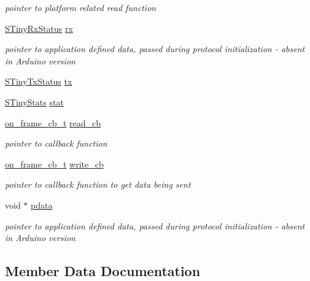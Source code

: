 \begin{DoxyCompactItemize}
\begin{DoxyCompactList}\small\item\em pointer to platform related read function \end{DoxyCompactList}\item 
\hyperlink{structSTinyRxStatus}{S\+Tiny\+Rx\+Status} \hyperlink{structSTinyData_aa3b43db99a1a6bf3d562f932d5a539db}{rx}
\begin{DoxyCompactList}\small\item\em pointer to application defined data, passed during protocol initialization -\/ absent in Arduino version \end{DoxyCompactList}\item 
\hyperlink{structSTinyTxStatus}{S\+Tiny\+Tx\+Status} \hyperlink{structSTinyData_aa099adb35f3494332747eb18851fbb23}{tx}
\item 
\hyperlink{structSTinyStats}{S\+Tiny\+Stats} \hyperlink{structSTinyData_a16ba8c9e60d6aee3fcd4909f85561f3d}{stat}
\item 
\hyperlink{inc_2tiny__layer2_8h_acf94db3677aab46f4a42978d53cc23e3}{on\+\_\+frame\+\_\+cb\+\_\+t} \hyperlink{structSTinyData_a31ba50154472c11e0d063b0aeef95f4d}{read\+\_\+cb}
\begin{DoxyCompactList}\small\item\em pointer to callback function \end{DoxyCompactList}\item 
\hyperlink{inc_2tiny__layer2_8h_acf94db3677aab46f4a42978d53cc23e3}{on\+\_\+frame\+\_\+cb\+\_\+t} \hyperlink{structSTinyData_ada334c88e86bfd2c10191f65818c3fb3}{write\+\_\+cb}
\begin{DoxyCompactList}\small\item\em pointer to callback function to get data being sent \end{DoxyCompactList}\item 
\hypertarget{structSTinyData_a3ac48d44af9b2912dd980c7377a020be}{}void $\ast$ \hyperlink{structSTinyData_a3ac48d44af9b2912dd980c7377a020be}{pdata}\label{structSTinyData_a3ac48d44af9b2912dd980c7377a020be}

\begin{DoxyCompactList}\small\item\em pointer to application defined data, passed during protocol initialization -\/ absent in Arduino version \end{DoxyCompactList}\end{DoxyCompactItemize}


\subsection{Member Data Documentation}
\hypertarget{structSTinyData_a31ba50154472c11e0d063b0aeef95f4d}{}
